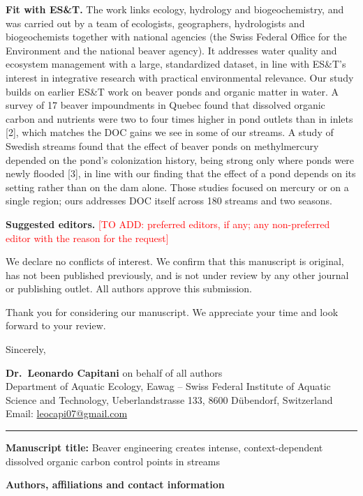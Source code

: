 \documentclass[11pt,a4paper]{article}
\newcommand{\todo}[1]{\textcolor{red}{[TO ADD: #1]}}
\begin{document}
\textbf{Fit with ES\&T.} The work links ecology, hydrology and biogeochemistry, and was carried out by a team of ecologists, geographers, hydrologists and biogeochemists together with national agencies (the Swiss Federal Office for the Environment and the national beaver agency). It addresses water quality and ecosystem management with a large, standardized dataset, in line with ES\&T's interest in integrative research with practical environmental relevance. Our study builds on earlier ES\&T work on beaver ponds and organic matter in water. A survey of 17 beaver impoundments in Quebec found that dissolved organic carbon and nutrients were two to four times higher in pond outlets than in inlets [2], which matches the DOC gains we see in some of our streams. A study of Swedish streams found that the effect of beaver ponds on methylmercury depended on the pond's colonization history, being strong only where ponds were newly flooded [3], in line with our finding that the effect of a pond depends on its setting rather than on the dam alone. Those studies focused on mercury or on a single region; ours addresses DOC itself across 180 streams and two seasons.

\textbf{Suggested editors.} \todo{preferred editors, if any; any non-preferred editor with the reason for the request}

We declare no conflicts of interest. We confirm that this manuscript is original, has not been published previously, and is not under review by any other journal or publishing outlet. All authors approve this submission.

Thank you for considering our manuscript. We appreciate your time and look forward to your review.

Sincerely,

\textbf{Dr.\ Leonardo Capitani} on behalf of all authors\\
Department of Aquatic Ecology, Eawag -- Swiss Federal Institute of Aquatic Science and Technology, Ueberlandstrasse 133, 8600 D\"ubendorf, Switzerland\\
Email: \href{mailto:leocapi07@gmail.com}{leocapi07@gmail.com}

\bigskip\hrule\bigskip

\textbf{Manuscript title:} Beaver engineering creates intense, context-dependent dissolved organic carbon control points in streams

\textbf{Authors, affiliations and contact information}
\end{document}
